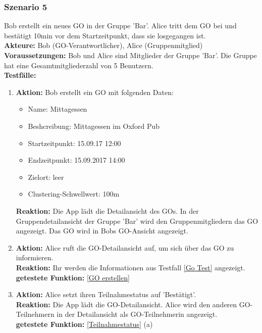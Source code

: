 \documentclass[parskip=full]{scrartcl}
\def\threedigits#1{%
  \ifnum#1<100 0\fi
  \ifnum#1<10 0\fi
  \number#1}
\begin{document}
\subsubsection*{Szenario 5}Bob erstellt ein neues GO in der Gruppe 'Bar'. Alice tritt dem GO bei und bestätigt 10min vor dem Startzeitpunkt, dass sie losgegangen ist.\\

\textbf{Akteure:} Bob (GO-Verantwortlicher), Alice (Gruppenmitglied)\\

\textbf{Voraussetzungen: }Bob und Alice sind Mitglieder der Gruppe 'Bar'. Die Gruppe hat eine Gesamtmitgliederzahl von 5 Benutzern.\\

\textbf{Testfälle:}
\begin{enumerate}[label={\textbf{/T\protect\threedigits{\theenumi}0/}}, leftmargin=*, resume]
	\item\label{Go Test} \textbf{Aktion:} Bob erstellt ein GO mit folgenden Daten:
	\begin{itemize}
		\item Name: Mittagessen
		\item Beshcreibung: Mittagessen im Oxford Pub
		\item Startzeitpunkt: 15.09.17 12:00
		\item Endzeitpunkt: 15.09.2017 14:00
		\item Zielort: leer
		\item Clustering-Schwellwert: 100m
	\end{itemize}
	\textbf{Reaktion:} Die App lädt die Detailansicht des GOs. In der Gruppendetailansicht der Gruppe 'Bar' wird den Gruppenmitgliedern das GO angezeigt. Das GO wird in Bobs GO-Ansicht angezeigt.\\
	\item \textbf{Aktion:} Alice ruft die GO-Detailansicht auf, um sich über das GO zu informieren.\\
	\textbf{Reaktion:} Ihr werden die Informationen aus Testfall \ref{Go Test} angezeigt.\\
	\textbf{getestete Funktion:} \ref{GO erstellen}
	\item \textbf{Aktion:} Alice setzt ihren Teilnahmestatus auf 'Bestätigt'.\\
	\textbf{Reaktion:} Die App lädt die GO-Detailansicht. Alice wird den anderen GO-Teilnehmern in der Detailansicht als GO-Teilnehmerin angezeigt.\\
	\textbf{getestete Funktion:} \ref{Teilnahmestatus} (a)

\end{enumerate}
\end{document}
